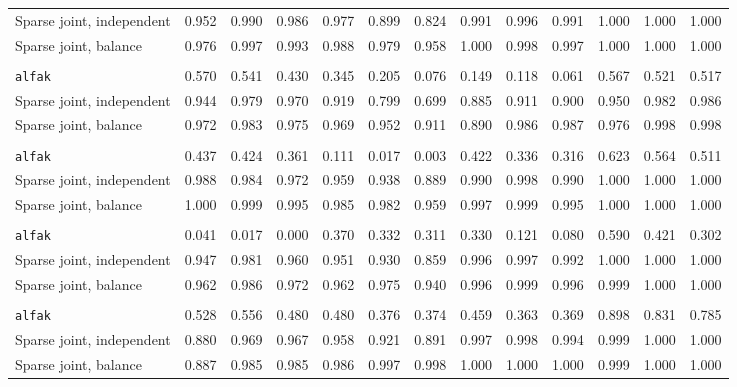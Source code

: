 \begin{center}
\begin{tabular}{l*{12}{r}}
\quad Sparse joint, independent & 0.952 & 0.990 & 0.986 & 0.977 & 0.899 & 0.824 & 0.991 & 0.996 & 0.991 & 1.000 & 1.000 & 1.000 \\
\quad Sparse joint, balance & 0.976 & 0.997 & 0.993 & 0.988 & 0.979 & 0.958 & 1.000 & 0.998 & 0.997 & 1.000 & 1.000 & 1.000 \\
\addlinespace[2pt]
\multicolumn{13}{l}{\textit{500/700, 1080 d}} \\
\quad \texttt{alfak} & 0.570 & 0.541 & 0.430 & 0.345 & 0.205 & 0.076 & 0.149 & 0.118 & 0.061 & 0.567 & 0.521 & 0.517 \\
\quad Sparse joint, independent & 0.944 & 0.979 & 0.970 & 0.919 & 0.799 & 0.699 & 0.885 & 0.911 & 0.900 & 0.950 & 0.982 & 0.986 \\
\quad Sparse joint, balance & 0.972 & 0.983 & 0.975 & 0.969 & 0.952 & 0.911 & 0.890 & 0.986 & 0.987 & 0.976 & 0.998 & 0.998 \\
\addlinespace[2pt]
\multicolumn{13}{l}{\textit{500/700, bottleneck}} \\
\quad \texttt{alfak} & 0.437 & 0.424 & 0.361 & 0.111 & 0.017 & 0.003 & 0.422 & 0.336 & 0.316 & 0.623 & 0.564 & 0.511 \\
\quad Sparse joint, independent & 0.988 & 0.984 & 0.972 & 0.959 & 0.938 & 0.889 & 0.990 & 0.998 & 0.990 & 1.000 & 1.000 & 1.000 \\
\quad Sparse joint, balance & 1.000 & 0.999 & 0.995 & 0.985 & 0.982 & 0.959 & 0.997 & 0.999 & 0.995 & 1.000 & 1.000 & 1.000 \\
\addlinespace[2pt]
\multicolumn{13}{l}{\textit{100/3000, 360 d}} \\
\quad \texttt{alfak} & 0.041 & 0.017 & 0.000 & 0.370 & 0.332 & 0.311 & 0.330 & 0.121 & 0.080 & 0.590 & 0.421 & 0.302 \\
\quad Sparse joint, independent & 0.947 & 0.981 & 0.960 & 0.951 & 0.930 & 0.859 & 0.996 & 0.997 & 0.992 & 1.000 & 1.000 & 1.000 \\
\quad Sparse joint, balance & 0.962 & 0.986 & 0.972 & 0.962 & 0.975 & 0.940 & 0.996 & 0.999 & 0.996 & 0.999 & 1.000 & 1.000 \\
\addlinespace[2pt]
\multicolumn{13}{l}{\textit{3000/100, 360 d}} \\
\quad \texttt{alfak} & 0.528 & 0.556 & 0.480 & 0.480 & 0.376 & 0.374 & 0.459 & 0.363 & 0.369 & 0.898 & 0.831 & 0.785 \\
\quad Sparse joint, independent & 0.880 & 0.969 & 0.967 & 0.958 & 0.921 & 0.891 & 0.997 & 0.998 & 0.994 & 0.999 & 1.000 & 1.000 \\
\quad Sparse joint, balance & 0.887 & 0.985 & 0.985 & 0.986 & 0.997 & 0.998 & 1.000 & 1.000 & 1.000 & 0.999 & 1.000 & 1.000 \\
\bottomrule
\end{tabular}
\end{center}
